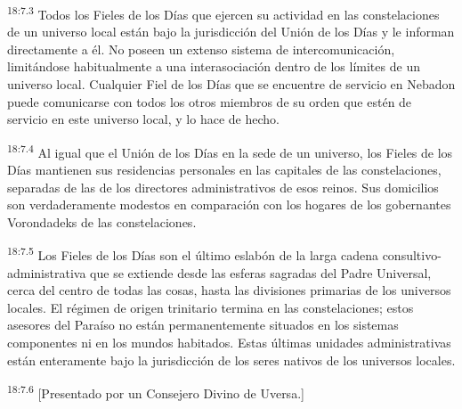 \par
\textsuperscript{18:7.3} Todos los Fieles de los Días que ejercen su actividad en las constelaciones de un universo local están bajo la jurisdicción del Unión de los Días y le informan directamente a él. No poseen un extenso sistema de intercomunicación, limitándose habitualmente a una interasociación dentro de los límites de un universo local. Cualquier Fiel de los Días que se encuentre de servicio en Nebadon puede comunicarse con todos los otros miembros de su orden que estén de servicio en este universo local, y lo hace de hecho.

\par
\textsuperscript{18:7.4} Al igual que el Unión de los Días en la sede de un universo, los Fieles de los Días mantienen sus residencias personales en las capitales de las constelaciones, separadas de las de los directores administrativos de esos reinos. Sus domicilios son verdaderamente modestos en comparación con los hogares de los gobernantes Vorondadeks de las constelaciones.

\par
\textsuperscript{18:7.5} Los Fieles de los Días son el último eslabón de la larga cadena consultivo-administrativa que se extiende desde las esferas sagradas del Padre Universal, cerca del centro de todas las cosas, hasta las divisiones primarias de los universos locales. El régimen de origen trinitario termina en las constelaciones; estos asesores del Paraíso no están permanentemente situados en los sistemas componentes ni en los mundos habitados. Estas últimas unidades administrativas están enteramente bajo la jurisdicción de los seres nativos de los universos locales.

\par
\textsuperscript{18:7.6} [Presentado por un Consejero Divino de Uversa.]
